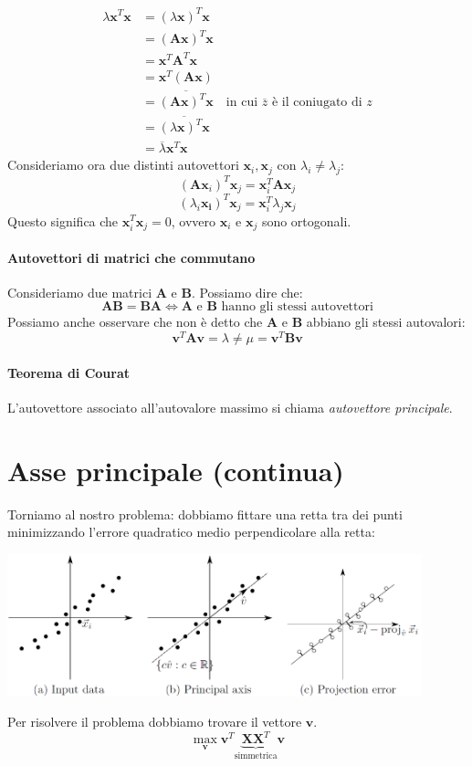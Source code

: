 \documentclass{article}
\begin{document}
        \begin{align*}
            \lambda \mathbf{x}^T\mathbf{x} &= (\lambda \mathbf{x})^T\mathbf{x} \\
            &=(\mathbf{Ax})^T\mathbf{x}\\
            &=\mathbf{x}^T\mathbf{A}^T\mathbf{x} \\
            &=\mathbf{x}^T(\mathbf{Ax}) \\
            &=\overline{(\mathbf{Ax})^T\mathbf{x}} \quad \text{in cui $\overline{z}$ è il coniugato di $z$}\\
            &=\overline{(\lambda\mathbf{x})^T\mathbf{x}} \\
            &=\overline{\lambda}\mathbf{x}^T\mathbf{x}
        \end{align*}
        Consideriamo ora due distinti autovettori $\mathbf{x}_i,\mathbf{x}_j$ con $\lambda_i \neq \lambda_j$:
        \[(\mathbf{Ax}_i)^T\mathbf{x}_j = \mathbf{x}_i^T\mathbf{Ax}_j\]
        \[(\lambda_i \mathbf{x_i})^T \mathbf{x}_j = \mathbf{x}_i^T\lambda_j\mathbf{x}_j\]
        Questo significa che $\mathbf{x}_i^T\mathbf{x}_j = 0$, ovvero $\mathbf{x}_i$ e $\mathbf{x}_j$ sono ortogonali.
    
        \paragraph{Autovettori di matrici che commutano}
        Consideriamo due matrici $\mathbf{A}$ e $\mathbf{B}$. Possiamo dire che:
        \[\mathbf{AB} = \mathbf{BA} \Leftrightarrow \mathbf{A} \text{ e }\mathbf{B} \text{ hanno gli stessi autovettori}\] 
        Possiamo anche osservare che non è detto che $\mathbf{A}$ e $\mathbf{B}$ abbiano gli stessi autovalori:
        \[\mathbf{v}^T\mathbf{Av} = \lambda \neq \mu = \mathbf{v}^T\mathbf{Bv}\]
        \paragraph{Teorema di Courat}
            L'autovettore associato all'autovalore massimo si chiama \emph{autovettore principale}.

    \section{Asse principale \small{(continua)}}
        Torniamo al nostro problema: dobbiamo fittare una retta tra dei punti minimizzando l'errore quadratico medio 
        perpendicolare alla retta:
        \begin{center}\includegraphics[width=12cm]{principal_axis.png}\end{center}
        Per risolvere il problema dobbiamo trovare il vettore $\mathbf{v}$.
        \[\max_{\mathbf{v}} \mathbf{v}^T \underbrace{\mathbf{XX}^T}_\text{simmetrica} \mathbf{v}\]
\end{document}

